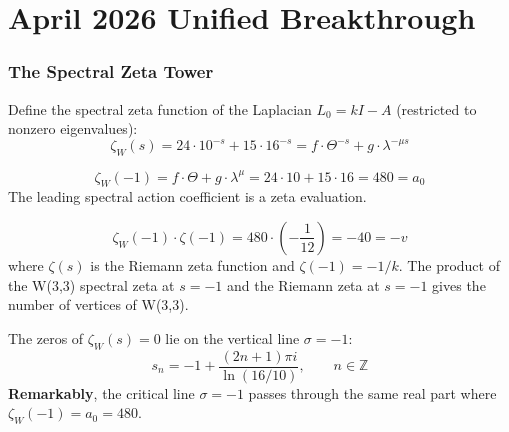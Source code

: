 \clearpage
\part{April 2026 Unified Breakthrough}

\section{The Spectral Zeta Tower}
\label{sec:zeta-tower}

\begin{definition}
Define the spectral zeta function of the Laplacian $L_0 = kI - A$
(restricted to nonzero eigenvalues):
\begin{equation}
\boxed{\zeta_W(s) = 24\cdot 10^{-s} + 15\cdot 16^{-s} = f\cdot\Theta^{-s} + g\cdot\lambda^{-\mu s}}
\end{equation}
\end{definition}

\begin{theorem}
\label{thm:zeta-a0}
\begin{equation}
\boxed{\zeta_W(-1) = f\cdot\Theta + g\cdot\lambda^\mu = 24\cdot 10 + 15\cdot 16 = 480 = a_0}
\end{equation}
The leading spectral action coefficient is a zeta evaluation.
\end{theorem}

\begin{theorem}
\label{thm:zeta-product}
\begin{equation}
\boxed{\zeta_W(-1)\cdot\zeta(-1) = 480\cdot\left(-\frac{1}{12}\right) = -40 = -v}
\end{equation}
where $\zeta(s)$ is the Riemann zeta function and $\zeta(-1) = -1/k$.
The product of the W(3,3) spectral zeta at $s=-1$ and the Riemann zeta
at $s=-1$ gives the number of vertices of W(3,3).
\end{theorem}

\begin{theorem}
The zeros of $\zeta_W(s) = 0$ lie on the vertical line $\sigma = -1$:
\begin{equation}
s_n = -1 + \frac{(2n+1)\pi i}{\ln(16/10)}, \qquad n\in\mathbb{Z}
\end{equation}
\textbf{Remarkably}, the critical line $\sigma=-1$ passes through the
same real part where $\zeta_W(-1) = a_0 = 480$.
\end{theorem}

